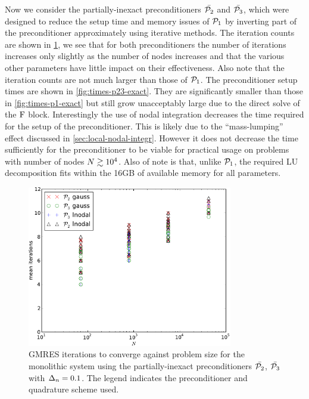 Now we consider the partially-inexact preconditioners $\bar{\mathcal{P}_2}$ and $\bar{\mathcal{P}_3}$, which were designed to reduce the setup time and memory issues of $\mathcal{P}_1$ by inverting part of the preconditioner approximately using iterative methods.
The iteration counts are shown in \cref{fig:its-p23-exact}, we see that for both preconditioners the number of iterations increases only slightly as the number of nodes increases and that the various other parameters have little impact on their effectiveness.
Also note that the iteration counts are not much larger than those of $\mathcal{P}_1$.
The preconditioner setup times are shown in \cref{fig:times-p23-exact}.
They are significantly smaller than those in \cref{fig:times-p1-exact} but still grow unacceptably large due to the direct solve of the $\mathrm{F}$ block.
Interestingly the use of nodal integration decreases the time required for the setup of the preconditioner.
This is likely due to the ``mass-lumping'' effect discussed in \cref{sec:local-nodal-integr}.
However it does not decrease the time sufficiently for the preconditioner to be viable for practical usage on problems with number of nodes $N \gtrsim 10^4$.
Also of note is that, unlike $\mathcal{P}_1$, the required LU decomposition fits within the 16GB of available memory for all parameters.

\begin{figure}
  \centering
  \includegraphics[width=0.8\textwidth]{plots/linear_solvers_p2p3/implicitexact-meanofnsolveritersvsinitialnnode.pdf}
  \caption{GMRES iterations to converge against problem size for the monolithic system using the partially-inexact preconditioners $\bar{\mathcal{P}_2}$, $\bar{\mathcal{P}_3}$ with $\Delta_{n}=0.1$.
The legend indicates the preconditioner and quadrature scheme used.
}
  \label{fig:its-p23-exact}
\end{figure}

